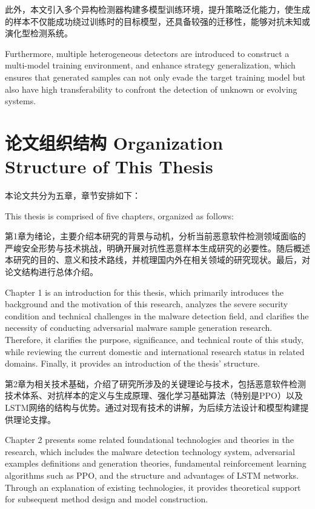 此外，本文引入多个异构检测器构建多模型训练环境，提升策略泛化能力，使生成的样本不仅能成功绕过训练时的目标模型，还具备较强的迁移性，能够对抗未知或演化型检测系统。

Furthermore, multiple heterogeneous detectors are introduced to construct a multi-model training environment, and enhance strategy generalization, which ensures that generated samples can not only evade the target training model but also have high transferability to confront the detection of unknown or evolving systems.


\section{论文组织结构 Organization Structure of This Thesis}
本论文共分为五章，章节安排如下：

This thesis is comprised of five chapters, organized as follows:

第1章为绪论，主要介绍本研究的背景与动机，分析当前恶意软件检测领域面临的严峻安全形势与技术挑战，明确开展对抗性恶意样本生成研究的必要性。随后概述本研究的目的、意义和技术路线，并梳理国内外在相关领域的研究现状。最后，对论文结构进行总体介绍。

Chapter 1 is an introduction for this thesis, which primarily introduces the background and the motivation of this research, analyzes the severe security condition and technical challenges in the malware detection field, and clarifies the necessity of conducting adversarial malware sample generation research. Therefore, it clarifies the purpose, significance, and technical route of this study, while reviewing the current domestic and international research status in related domains. Finally, it provides an introduction of the thesis’ structure.

第2章为相关技术基础，介绍了研究所涉及的关键理论与技术，包括恶意软件检测技术体系、对抗样本的定义与生成原理、强化学习基础算法（特别是PPO）以及LSTM网络的结构与优势。通过对现有技术的讲解，为后续方法设计和模型构建提供理论支撑。

Chapter 2 presents some related foundational technologies and theories in the research, which includes the malware detection technology system, adversarial examples definitions and generation theories, fundamental reinforcement learning algorithms such as PPO, and the structure and advantages of LSTM networks. Through an explanation of existing technologies, it provides theoretical support for subsequent method design and model construction.

